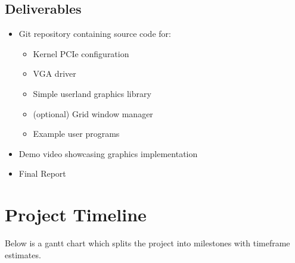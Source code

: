 \subsection{Deliverables}

\begin{itemize}
    \item{Git repository containing source code for:}
          \begin{itemize}
              \item{Kernel PCIe configuration}
              \item{VGA driver}
              \item{Simple userland graphics library}
              \item{(optional) Grid window manager}
              \item{Example user programs}
          \end{itemize}
    \item{Demo video showcasing graphics implementation}
    \item{Final Report}
\end{itemize}


%
%
\section{Project Timeline}

Below is a gantt chart which splits the project into milestones with timeframe estimates. \\

